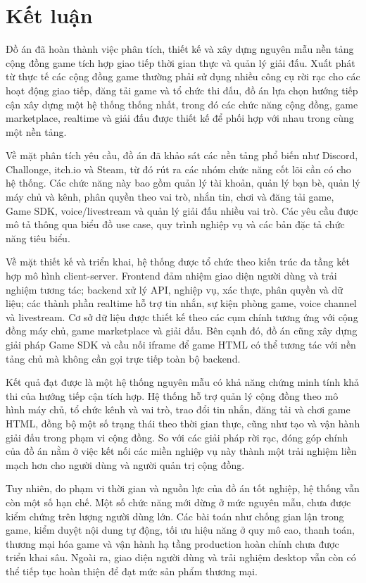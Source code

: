 \documentclass[../DoAn.tex]{subfiles}
\begin{document}
\section{Kết luận}

Đồ án đã hoàn thành việc phân tích, thiết kế và xây dựng nguyên mẫu nền tảng cộng đồng game tích hợp giao tiếp thời gian thực và quản lý giải đấu. Xuất phát từ thực tế các cộng đồng game thường phải sử dụng nhiều công cụ rời rạc cho các hoạt động giao tiếp, đăng tải game và tổ chức thi đấu, đồ án lựa chọn hướng tiếp cận xây dựng một hệ thống thống nhất, trong đó các chức năng cộng đồng, game marketplace, realtime và giải đấu được thiết kế để phối hợp với nhau trong cùng một nền tảng.

Về mặt phân tích yêu cầu, đồ án đã khảo sát các nền tảng phổ biến như Discord, Challonge, itch.io và Steam, từ đó rút ra các nhóm chức năng cốt lõi cần có cho hệ thống. Các chức năng này bao gồm quản lý tài khoản, quản lý bạn bè, quản lý máy chủ và kênh, phân quyền theo vai trò, nhắn tin, chơi và đăng tải game, Game SDK, voice/livestream và quản lý giải đấu nhiều vai trò. Các yêu cầu được mô tả thông qua biểu đồ use case, quy trình nghiệp vụ và các bản đặc tả chức năng tiêu biểu.

Về mặt thiết kế và triển khai, hệ thống được tổ chức theo kiến trúc đa tầng kết hợp mô hình client-server. Frontend đảm nhiệm giao diện người dùng và trải nghiệm tương tác; backend xử lý API, nghiệp vụ, xác thực, phân quyền và dữ liệu; các thành phần realtime hỗ trợ tin nhắn, sự kiện phòng game, voice channel và livestream. Cơ sở dữ liệu được thiết kế theo các cụm chính tương ứng với cộng đồng máy chủ, game marketplace và giải đấu. Bên cạnh đó, đồ án cũng xây dựng giải pháp Game SDK và cầu nối iframe để game HTML có thể tương tác với nền tảng chủ mà không cần gọi trực tiếp toàn bộ backend.

Kết quả đạt được là một hệ thống nguyên mẫu có khả năng chứng minh tính khả thi của hướng tiếp cận tích hợp. Hệ thống hỗ trợ quản lý cộng đồng theo mô hình máy chủ, tổ chức kênh và vai trò, trao đổi tin nhắn, đăng tải và chơi game HTML, đồng bộ một số trạng thái theo thời gian thực, cũng như tạo và vận hành giải đấu trong phạm vi cộng đồng. So với các giải pháp rời rạc, đóng góp chính của đồ án nằm ở việc kết nối các miền nghiệp vụ này thành một trải nghiệm liền mạch hơn cho người dùng và người quản trị cộng đồng.

Tuy nhiên, do phạm vi thời gian và nguồn lực của đồ án tốt nghiệp, hệ thống vẫn còn một số hạn chế. Một số chức năng mới dừng ở mức nguyên mẫu, chưa được kiểm chứng trên lượng người dùng lớn. Các bài toán như chống gian lận trong game, kiểm duyệt nội dung tự động, tối ưu hiệu năng ở quy mô cao, thanh toán, thương mại hóa game và vận hành hạ tầng production hoàn chỉnh chưa được triển khai sâu. Ngoài ra, giao diện người dùng và trải nghiệm desktop vẫn còn có thể tiếp tục hoàn thiện để đạt mức sản phẩm thương mại.
\end{document}
